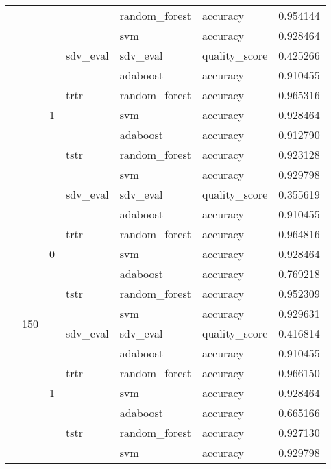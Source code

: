 \begin{longtable}{llllllr}
\cline{5-7}
 &  &  &  & random_forest & accuracy & 0.954144 \\
\cline{5-7}
 &  &  &  & svm & accuracy & 0.928464 \\
\cline{3-7} \cline{4-7} \cline{5-7}
 &  & \multirow[t]{7}{*}{1} & sdv_eval & sdv_eval & quality_score & 0.425266 \\
\cline{4-7} \cline{5-7}
 &  &  & \multirow[t]{3}{*}{trtr} & adaboost & accuracy & 0.910455 \\
\cline{5-7}
 &  &  &  & random_forest & accuracy & 0.965316 \\
\cline{5-7}
 &  &  &  & svm & accuracy & 0.928464 \\
\cline{4-7} \cline{5-7}
 &  &  & \multirow[t]{3}{*}{tstr} & adaboost & accuracy & 0.912790 \\
\cline{5-7}
 &  &  &  & random_forest & accuracy & 0.923128 \\
\cline{5-7}
 &  &  &  & svm & accuracy & 0.929798 \\
\cline{2-7} \cline{3-7} \cline{4-7} \cline{5-7}
 & \multirow[t]{14}{*}{150} & \multirow[t]{7}{*}{0} & sdv_eval & sdv_eval & quality_score & 0.355619 \\
\cline{4-7} \cline{5-7}
 &  &  & \multirow[t]{3}{*}{trtr} & adaboost & accuracy & 0.910455 \\
\cline{5-7}
 &  &  &  & random_forest & accuracy & 0.964816 \\
\cline{5-7}
 &  &  &  & svm & accuracy & 0.928464 \\
\cline{4-7} \cline{5-7}
 &  &  & \multirow[t]{3}{*}{tstr} & adaboost & accuracy & 0.769218 \\
\cline{5-7}
 &  &  &  & random_forest & accuracy & 0.952309 \\
\cline{5-7}
 &  &  &  & svm & accuracy & 0.929631 \\
\cline{3-7} \cline{4-7} \cline{5-7}
 &  & \multirow[t]{7}{*}{1} & sdv_eval & sdv_eval & quality_score & 0.416814 \\
\cline{4-7} \cline{5-7}
 &  &  & \multirow[t]{3}{*}{trtr} & adaboost & accuracy & 0.910455 \\
\cline{5-7}
 &  &  &  & random_forest & accuracy & 0.966150 \\
\cline{5-7}
 &  &  &  & svm & accuracy & 0.928464 \\
\cline{4-7} \cline{5-7}
 &  &  & \multirow[t]{3}{*}{tstr} & adaboost & accuracy & 0.665166 \\
\cline{5-7}
 &  &  &  & random_forest & accuracy & 0.927130 \\
\cline{5-7}
 &  &  &  & svm & accuracy & 0.929798 \\
\cline{1-7} \cline{2-7} \cline{3-7} \cline{4-7} \cline{5-7}
\end{longtable}
